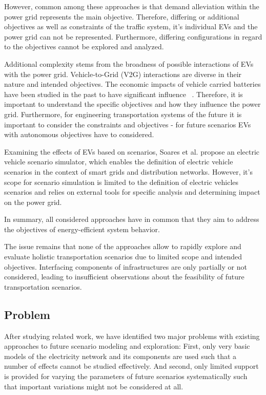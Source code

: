 However, common among these approaches is that demand alleviation within the power grid represents the main objective. Therefore, differing or additional objectives as well as constraints of the traffic system, it's individual EVs and the power grid can not be represented. Furthermore, differing configurations in regard to the objectives cannot be explored and analyzed. 

Additional complexity stems from the broadness of possible interactions of EVs with the power grid. Vehicle-to-Grid (V2G) interactions are diverse in their nature and intended objectives. The economic impacts of vehicle carried batteries have been studied in the past to have significant influence ~\cite{peterson2010economics,erdinc2014economic}. Therefore, it is important to understand the specific objectives and how they influence the power grid. Furthermore, for engineering transportation systems of the future it is important to consider the constraints and objectives - for future scenarios EVs with autonomous objectives have to considered.

Examining the effects of EVs based on scenarios, Soares et al. \cite{soares2012electric} propose an electric vehicle scenario simulator, which enables the definition of electric vehicle scenarios in the context of smart grids and distribution networks. However, it's scope for scenario simulation is limited to the definition of electric vehicles scenarios and relies on external tools for specific analysis and determining impact on the power grid.

In summary, all considered approaches have in common that they aim to address the objectives of energy-efficient system behavior.

The issue remains that none of the approaches allow to rapidly explore and evaluate holistic transportation scenarios due to limited scope and intended objectives. Interfacing components of infrastructures are only partially or not considered, leading to insufficient observations about the feasibility of future transportation scenarios.

\subsection{Problem}

After studying related work, we have identified two major problems with existing approaches to future scenario modeling and exploration: First, only very basic models of the electricity network and its components are used such that a number of effects cannot be studied effectively. And second, only limited support is provided for varying the parameters of future scenarios systematically such that important variations might not be considered at all.

